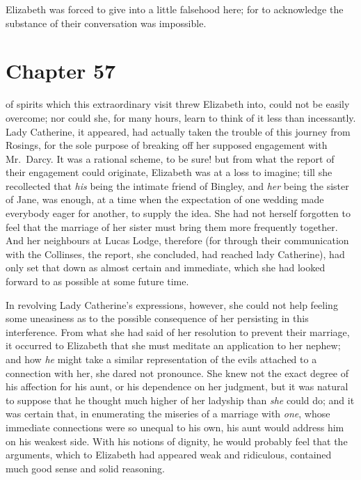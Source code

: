 Elizabeth was forced to give into a little falsehood here;
for to acknowledge the substance of their conversation was
impossible.



\chapter{Chapter 57}


 of spirits which this extraordinary visit
threw Elizabeth into, could not be easily overcome; nor
could she, for many hours, learn to think of it less than
incessantly.  Lady Catherine, it appeared, had actually taken
the trouble of this journey from Rosings, for the sole purpose
of breaking off her supposed engagement with Mr.\ Darcy.  It was
a rational scheme, to be sure!  but from what the report of
their engagement could originate, Elizabeth was at a loss to
imagine; till she recollected that \emph{his} being the intimate
friend of Bingley, and \emph{her} being the sister of Jane, was
enough, at a time when the expectation of one wedding made
everybody eager for another, to supply the idea.  She had not
herself forgotten to feel that the marriage of her sister must
bring them more frequently together.  And her neighbours at
Lucas Lodge, therefore (for through their communication with
the Collinses, the report, she concluded, had reached lady
Catherine), had only set that down as almost certain and
immediate, which she had looked forward to as possible at
some future time.

In revolving Lady Catherine's expressions, however, she could
not help feeling some uneasiness as to the possible consequence
of her persisting in this interference.  From what she had said
of her resolution to prevent their marriage, it occurred to
Elizabeth that she must meditate an application to her nephew;
and how \emph{he} might take a similar representation of the evils
attached to a connection with her, she dared not pronounce.
She knew not the exact degree of his affection for his aunt, or
his dependence on her judgment, but it was natural to suppose
that he thought much higher of her ladyship than \emph{she} could
do; and it was certain that, in enumerating the miseries of a
marriage with \emph{one}, whose immediate connections were so unequal
to his own, his aunt would address him on his weakest side.
With his notions of dignity, he would probably feel that the
arguments, which to Elizabeth had appeared weak and ridiculous,
contained much good sense and solid reasoning.

